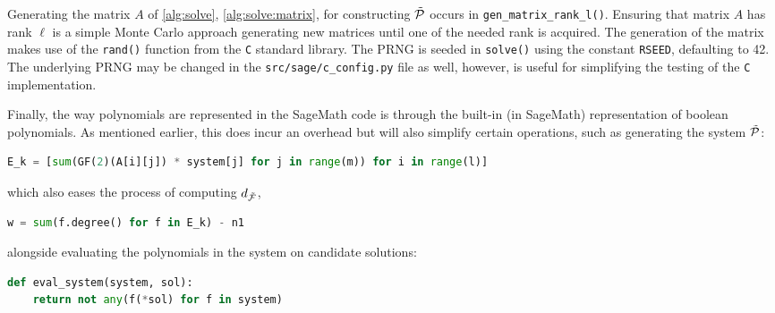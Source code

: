Generating the matrix $A$ of \cref{alg:solve}, \cref{alg:solve:matrix}, for constructing $\Tilde{\mathcal{P}}$ occurs in \texttt{gen\_matrix\_rank\_l()}. Ensuring that matrix $A$ has rank $\ell$ is a simple Monte Carlo approach generating new matrices until one of the needed rank is acquired. The generation of the matrix makes use of the \texttt{rand()} function from the \texttt{C} standard library. The PRNG is seeded in \texttt{solve()} using the constant \texttt{RSEED}, defaulting to 42. The underlying PRNG may be changed in the \texttt{src/sage/c\_config.py} file as well, however, is useful for simplifying the testing of the \texttt{C} implementation.

Finally, the way polynomials are represented in the SageMath code is through the built-in (in SageMath) representation of boolean polynomials. As mentioned earlier, this does incur an overhead but will also simplify certain operations, such as generating the system $\Tilde{\mathcal{P}}$:
\begin{lstlisting}[language=Python,style=mystyle]
E_k = [sum(GF(2)(A[i][j]) * system[j] for j in range(m)) for i in range(l)]
\end{lstlisting}
which also eases the process of computing $d_{\Tilde{\mathcal{F}}}$,
\begin{lstlisting}[language=Python,style=mystyle]
w = sum(f.degree() for f in E_k) - n1 
\end{lstlisting}
alongside evaluating the polynomials in the system on candidate solutions:
\begin{lstlisting}[language=Python,style=mystyle]
def eval_system(system, sol):
    return not any(f(*sol) for f in system)
\end{lstlisting}

